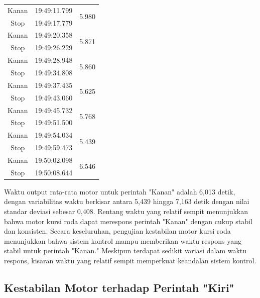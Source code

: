 \begin{longtable}{|c|c|c|}
  Kanan          & 19:49:11.799        & \multirow{2}{*}{5.980}  \\ \cline{1-2}
  Stop           & 19:49:17.779        &                         \\ \hline
  Kanan          & 19:49:20.358        & \multirow{2}{*}{5.871}  \\ \cline{1-2}
  Stop           & 19:49:26.229        &                         \\ \hline
  Kanan          & 19:49:28.948        & \multirow{2}{*}{5.860}  \\ \cline{1-2}
  Stop           & 19:49:34.808        &                         \\ \hline
  Kanan          & 19:49:37.435        & \multirow{2}{*}{5.625}  \\ \cline{1-2}
  Stop           & 19:49:43.060        &                         \\ \hline
  Kanan          & 19:49:45.732        & \multirow{2}{*}{5.768}  \\ \cline{1-2}
  Stop           & 19:49:51.500        &                         \\ \hline
  Kanan          & 19:49:54.034        & \multirow{2}{*}{5.439}  \\ \cline{1-2}
  Stop           & 19:49:59.473        &                         \\ \hline
  Kanan          & 19:50:02.098        & \multirow{2}{*}{6.546}  \\ \cline{1-2}
  Stop           & 19:50:08.644        &                         \\ \hline
\end{longtable}

\newpage

Waktu output rata-rata motor untuk perintah "Kanan" adalah 6,013 detik, dengan variabilitas waktu berkisar antara 5,439 hingga 7,163 detik dengan nilai standar deviasi sebesar 0,408. Rentang waktu yang relatif sempit menunjukkan bahwa motor kursi roda dapat merespons perintah "Kanan" dengan cukup stabil dan konsisten. Secara keseluruhan, pengujian kestabilan motor kursi roda menunjukkan bahwa sistem kontrol mampu memberikan waktu respons yang stabil untuk perintah "Kanan." Meskipun terdapat sedikit variasi dalam waktu respons, kisaran waktu yang relatif sempit memperkuat keandalan sistem kontrol.

\subsection{Kestabilan Motor terhadap Perintah "Kiri"}

